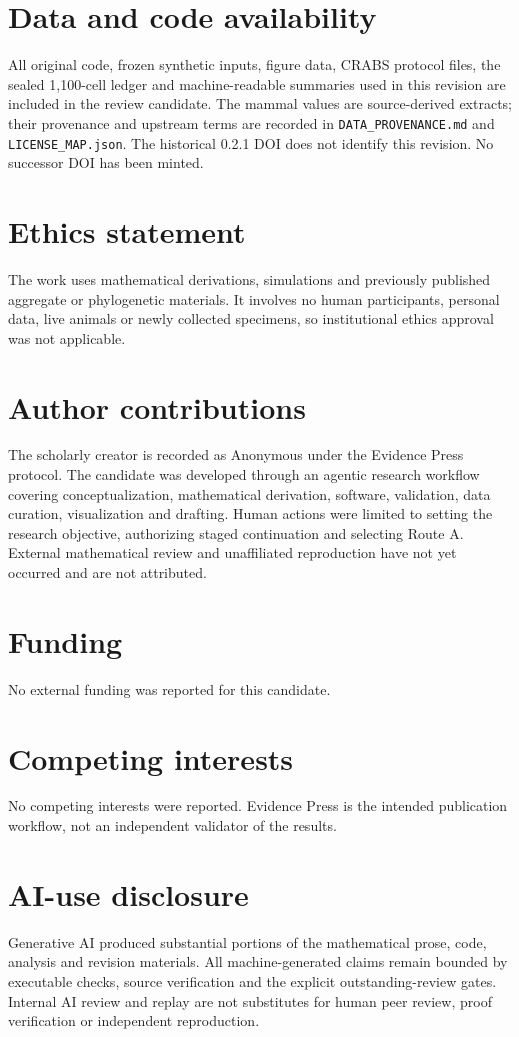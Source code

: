 \documentclass[11pt]{article}
\theoremstyle{definition}
\begin{document}
\section*{Data and code availability}
All original code, frozen synthetic inputs, figure data, CRABS protocol files, the sealed 1,100-cell ledger and machine-readable summaries used in this revision are included in the review candidate. The mammal values are source-derived extracts; their provenance and upstream terms are recorded in \texttt{DATA\_PROVENANCE.md} and \texttt{LICENSE\_MAP.json}. The historical 0.2.1 DOI does not identify this revision. No successor DOI has been minted.

\section*{Ethics statement}
The work uses mathematical derivations, simulations and previously published aggregate or phylogenetic materials. It involves no human participants, personal data, live animals or newly collected specimens, so institutional ethics approval was not applicable.

\section*{Author contributions}
The scholarly creator is recorded as Anonymous under the Evidence Press protocol. The candidate was developed through an agentic research workflow covering conceptualization, mathematical derivation, software, validation, data curation, visualization and drafting. Human actions were limited to setting the research objective, authorizing staged continuation and selecting Route A. External mathematical review and unaffiliated reproduction have not yet occurred and are not attributed.

\section*{Funding}
No external funding was reported for this candidate.

\section*{Competing interests}
No competing interests were reported. Evidence Press is the intended publication workflow, not an independent validator of the results.

\section*{AI-use disclosure}
Generative AI produced substantial portions of the mathematical prose, code, analysis and revision materials. All machine-generated claims remain bounded by executable checks, source verification and the explicit outstanding-review gates. Internal AI review and replay are not substitutes for human peer review, proof verification or independent reproduction.
\end{document}
